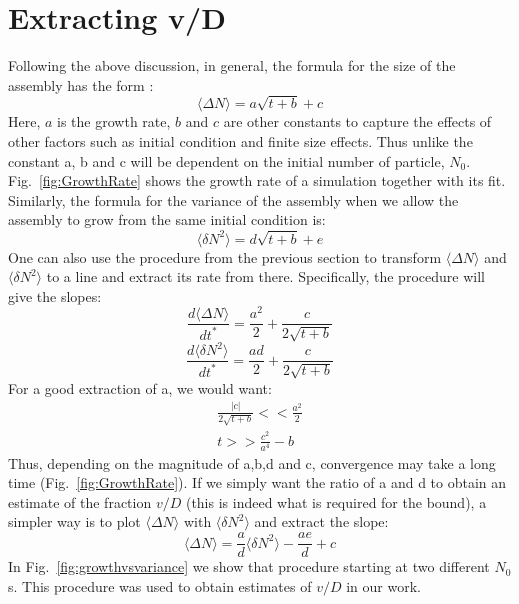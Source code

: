 \documentclass[amsmath,preprintnumbers,10pt,nofootinbib,prl,twocolumn]{revtex4-1}
\begin{document}
\section{Extracting v/D}
Following the above discussion, in general, the formula for the size of the assembly has the form :
\begin{equation}
 \langle\Delta N\rangle=a\sqrt{t+b}+c
\end{equation}
Here,  $a$ is the growth rate, $b$ and  $c$ are other constants to capture the effects of other factors such as initial condition and finite size effects. Thus unlike the constant a, b and c will be dependent on the initial number of particle, $N_0$. Fig.~\ref{fig:GrowthRate} shows the growth rate of a simulation together with its fit. Similarly, the formula for the variance of the assembly when we allow the assembly to grow from the same initial condition is:
\begin{equation}
\langle\delta N^2\rangle =d\sqrt{t+b}+e
\end{equation}
One can also use the procedure from the previous section to transform $\langle\Delta N\rangle$ and $\langle\delta N^2\rangle$ to a line and extract its rate from there.
Specifically, the procedure will give the slopes:
\begin{equation}
\frac{d\langle\Delta N \rangle}{dt^{*}}=\frac{a^2}{2}+\frac{c}{2\sqrt{t+b}}
\end{equation}
\begin{equation}
\frac{d\langle\delta N^2 \rangle}{dt^{*}}=\frac{ad}{2}+\frac{c}{2\sqrt{t+b}}
\end{equation}
For a good extraction of a, we would want:
\begin{equation}
\begin{split}
\frac{|c|}{2\sqrt{t+b}}<<\frac{a^2}{2}
\\ t >>\frac{c^2}{a^4}-b
\end{split}
\end{equation}
Thus, depending on the magnitude of a,b,d and c, convergence may take a long time (Fig.~\ref{fig:GrowthRate}). 
If we simply want the ratio of a and d to obtain an estimate of the fraction $v/D$ (this is indeed what is required for the bound), a simpler way is to plot $\langle\Delta N\rangle$ with  $\langle\delta N^2 \rangle$ and extract the slope:
\begin{equation}
\langle\Delta N\rangle=\frac{a}{d}\langle\delta N^2 \rangle-\frac{ae}{d}+c
\end{equation}
In Fig.~\ref{fig:growthvsvariance} we show that procedure starting at two different $N_0$s. This procedure was used to obtain estimates of $v/D$ in our work. 
\end{document}
